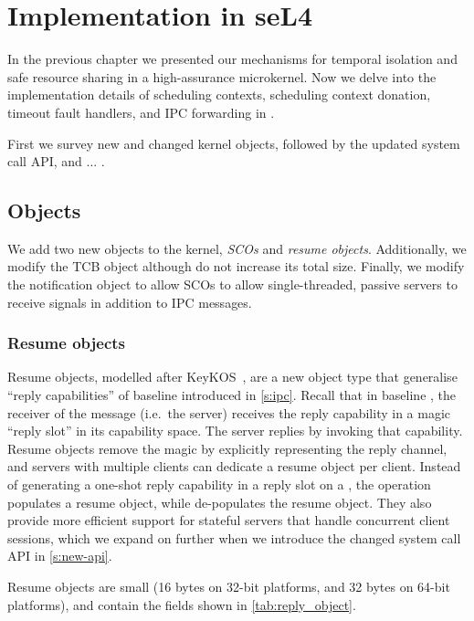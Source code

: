 \chapter{Implementation in seL4}
\label{chap:implementation}

In the previous chapter we presented our mechanisms for temporal isolation and safe resource sharing
in a high-assurance microkernel. 
Now we delve into the implementation details of scheduling contexts, scheduling context donation,
timeout fault handlers, and IPC forwarding in \selfour.

First we survey new and changed kernel objects, followed by the updated system call API, and ...
.

\section{Objects}

We add two new objects to the kernel, \emph{\glspl{SCO}} and \emph{resume objects}. Additionally, we modify
the \gls{TCB} object although do not increase its total size. Finally, we modify the notification
object to allow \glspl{SCO} to allow single-threaded, passive servers to receive signals in
addition to IPC messages.

\subsection{Resume objects}
\label{s:resume}

Resume objects, modelled after KeyKOS~\citep{Bomberger_FFHLS_92}, are
a new object type that generalise
``reply capabilities'' of baseline \selfour introduced in \cref{s:ipc}.
Recall that in baseline \selfour, the receiver of the message (i.e.\ the
server) receives the reply capability in a magic ``reply slot'' in its
capability space. The server replies by invoking that
capability. Resume objects remove the magic by explicitly representing
the reply channel, and servers with multiple clients can dedicate a resume object per client.
Instead of generating a one-shot reply capability in a reply slot on a \call, the operation
populates a resume object, while \recv de-populates the resume object. 
They also
provide more efficient support for stateful servers that handle
concurrent client sessions, which we expand on further when we introduce the changed system call \gls{API} in \cref{s:new-api}.

Resume objects are small (16 bytes on 32-bit platforms, and 32 bytes on 64-bit platforms), and
contain the fields shown in \cref{tab:reply_object}.

